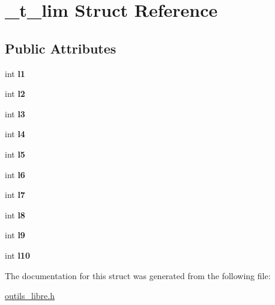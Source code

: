 \hypertarget{struct__t__lim}{\section{\-\_\-t\-\_\-lim Struct Reference}
\label{struct__t__lim}
}
\subsection*{Public Attributes}
\begin{DoxyCompactItemize}
\item 
\hypertarget{struct__t__lim_ad24a97fe2fc2862ba258241d8a74a952}{int {\bfseries l1}}\label{struct__t__lim_ad24a97fe2fc2862ba258241d8a74a952}

\item 
\hypertarget{struct__t__lim_acc724347cf08ad963ec9b7fc4314eff9}{int {\bfseries l2}}\label{struct__t__lim_acc724347cf08ad963ec9b7fc4314eff9}

\item 
\hypertarget{struct__t__lim_a5f80e5a7e9c9c836552fcf3d4fd82db8}{int {\bfseries l3}}\label{struct__t__lim_a5f80e5a7e9c9c836552fcf3d4fd82db8}

\item 
\hypertarget{struct__t__lim_a9ee8fa0f6b5668f44b6d7d217bea0b97}{int {\bfseries l4}}\label{struct__t__lim_a9ee8fa0f6b5668f44b6d7d217bea0b97}

\item 
\hypertarget{struct__t__lim_a96ec033a6ff3203e6f79c91a4557fc52}{int {\bfseries l5}}\label{struct__t__lim_a96ec033a6ff3203e6f79c91a4557fc52}

\item 
\hypertarget{struct__t__lim_afcbae9dd8fe242062a714b7838793b86}{int {\bfseries l6}}\label{struct__t__lim_afcbae9dd8fe242062a714b7838793b86}

\item 
\hypertarget{struct__t__lim_a24940558519a1e62a3d7f0a9ac0b0329}{int {\bfseries l7}}\label{struct__t__lim_a24940558519a1e62a3d7f0a9ac0b0329}

\item 
\hypertarget{struct__t__lim_a8def6dfcd28d356f4d5f93c7f0d9f1ff}{int {\bfseries l8}}\label{struct__t__lim_a8def6dfcd28d356f4d5f93c7f0d9f1ff}

\item 
\hypertarget{struct__t__lim_a6bfec49df206bf385fe731607d1e2378}{int {\bfseries l9}}\label{struct__t__lim_a6bfec49df206bf385fe731607d1e2378}

\item 
\hypertarget{struct__t__lim_a2566022be0783ae2b3bd4318ed875db1}{int {\bfseries l10}}\label{struct__t__lim_a2566022be0783ae2b3bd4318ed875db1}

\end{DoxyCompactItemize}


The documentation for this struct was generated from the following file\-:\begin{DoxyCompactItemize}
\item 
\hyperlink{outils__libre_8h}{outils\-\_\-libre.\-h}\end{DoxyCompactItemize}
